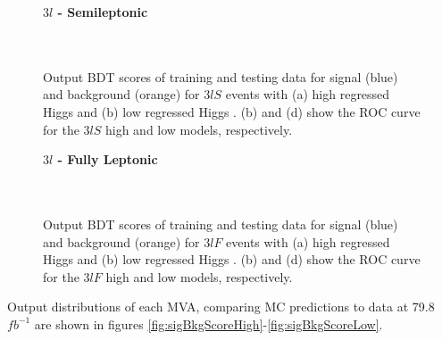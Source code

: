\begin{figure}[H]
  \centering
  \textbf{$3l$ - Semileptonic}\\
  \\                                   
  \\                                    
  \caption{Output BDT scores of training and testing data for signal (blue) and background (orange) for $3lS$ events with (a) high regressed Higgs \pt and (b) low regressed Higgs \pt. (b) and (d) show the ROC curve for the $3lS$ high and low \pt models, respectively.}
  \label{fig:sigBkgScore3lS}                                                                                                
\end{figure}

\begin{figure}[H]
  \centering
  \textbf{$3l$ - Fully Leptonic}\\
  \\                                  
  \\                                    
  \caption{Output BDT scores of training and testing data for signal (blue) and background (orange) for $3lF$ events with (a) high regressed Higgs \pt and (b) low regressed Higgs \pt. (b) and (d) show the ROC curve for the $3lF$ high and low \pt models, respectively.}
  \label{fig:sigBkgScore3lF}                                                                                                
\end{figure}

Output distributions of each MVA, comparing MC predictions to data at 79.8 $fb^{-1}$ are shown in figures \ref{fig:sigBkgScoreHigh}-\ref{fig:sigBkgScoreLow}. 

